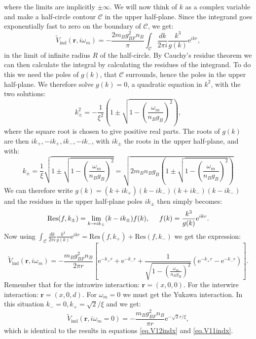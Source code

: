 where the limits are implicitly $\pm \infty$. We will now think of $k$ as a complex variable and make a half-circle contour $\mathcal{C}$ in the upper half-plane. Since the integrand goes exponentially fast to zero on the boundary of $\mathcal{C}$, we get:
\begin{equation}
\tilde{V}_{\text{ind}}(\mathbf{r}, i\omega_m) = -\frac{2m_Bg^2_{BF}n_B}{\pi}\int_{\mathcal{C}} \frac{dk}{2\pi i} \frac{k^3}{g(k)}\text{e}^{ikr}, \nonumber
\end{equation}
in the limit of infinite radius $R$ of the half-circle. By Cauchy's residue theorem we can then calculate the integral by calculating the residues of the integrand. To do this we need the poles of $g(k)$, that $\mathcal{C}$ surrounds, hence the poles in the upper half-plane. We therefore solve $g(k) = 0$, a quadratic equation in $k^2$, with the two solutions:
\begin{equation}
k^2_{\pm} = -\frac{1}{\xi^2}\left(1 \pm \sqrt{1 - \left(\frac{\omega_m}{n_Bg_B}\right)^2}\right), \nonumber
\end{equation} 
where the square root is chosen to give positive real parts. The roots of $g(k)$ are then $ik_+, -ik_+, ik_-, -ik_-$, with $ik_{\pm}$ the roots in the upper half-plane, and with: 
\begin{equation}
k_{\pm} = \frac{1}{\xi}\sqrt{1\pm \sqrt{1 - \left(\frac{\omega_m}{n_Bg_B}\right)^2}} = \sqrt{ 2m_Bn_Bg_B\left( 1 \pm \sqrt{1 - \left(\frac{\omega_m}{n_Bg_B}\right)^2 } \right) }
\label{eq.polesVindxomegam}
\end{equation}
We can therefore write $g(k) = (k + ik_+)(k - ik_-)(k + ik_-)(k - ik_-)$ and the residues in the upper half-plane poles $ik_{\pm}$ then simply becomes:
\begin{equation}
\text{Res}(f, k_{\pm}) = \lim_{k\to ik_{\pm}} (k - ik_{\pm})f(k), \hspace{0.5cm} f(k) = \frac{k^3}{g(k)}\text{e}^{ikr}. \nonumber
\end{equation}
Now using $\int_{\mathcal{C}} \frac{dk}{2\pi i} \frac{k^3}{g(k)}\text{e}^{ikr} = \text{Res}(f, k_+) + \text{Res}(f, k_-)$ we get the expression:
\begin{equation}
\tilde{V}_{\text{ind}}(\mathbf{r}, i\omega_m) = -\frac{m_Bg^2_{BF}n_B}{2\pi r}\left[ \text{e}^{-k_+r} + \text{e}^{-k_-r} + \frac{1}{ \sqrt{1 - \left(\frac{\omega_m}{n_Bg_B}\right)^2} }\left(\text{e}^{-k_+r} - \text{e}^{-k_-r}  \right) \right]. \nonumber
\end{equation}
Remember that for the intrawire interaction: $\mathbf{r} = (x, 0, 0)$. For the interwire interaction: $\mathbf{r} = (x, 0, d)$. For $\omega_m = 0$ we must get the Yukawa interaction. In this situation $k_- = 0, k_+ = \sqrt{2}/\xi$ and we get:
\begin{equation}
\tilde{V}_{\text{ind}}(\mathbf{r}, i\omega_m = 0) = -\frac{m_Bg^2_{BF}n_B}{\pi r}\text{e}^{-\sqrt{2}r/\xi}, \nonumber
\end{equation}
which is identical to the results in equations \eqref{eq.V12indx} and \eqref{eq.V11indx}. 

